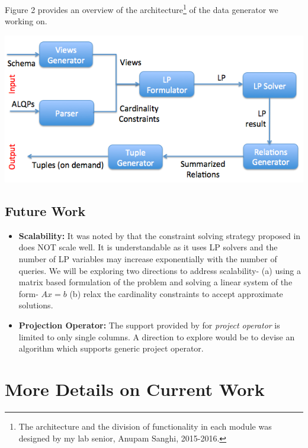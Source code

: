 \documentclass[]{article}
\newenvironment{Figure}
  {\par\medskip\noindent\minipage{\linewidth}}
  {\endminipage\par\medskip}
\begin{document}
\begin{multicols}{2}
		Figure 2 provides an overview of the architecture\footnote{The architecture and the division of functionality in each module was designed by my lab senior, Anupam Sanghi, 2015-2016. } of the data generator we working on.
        \begin{Figure}
                \centering
                \includegraphics[width=\linewidth]{figures/architecture.png}
                \label{fig:Architecture}
        \end{Figure}

        \subsection{Future Work}
        \begin{itemize}
		    \item {\bf Scalability:}
		    It was noted by \cite{rsgen} that the constraint solving strategy proposed in \cite{arasu, datasynth} does NOT scale well. 
			It is understandable as it uses LP solvers and the number of LP variables may increase exponentially with the number of queries. 
			We will be exploring two directions to address scalability- 
			(a) using a matrix based formulation of the problem and solving a linear system of the form- $Ax = b$  
			(b) relax the cardinality constraints to accept approximate solutions. 

			\item {\bf Projection Operator:}
			The support provided by \cite{arasu, datasynth} for \textit{project operator} is limited to only single columns. 
			A direction to explore would be to devise an algorithm which supports generic project operator. 
        \end{itemize}

	\section{More Details on Current Work}
	

\end{multicols}
\end{document}
